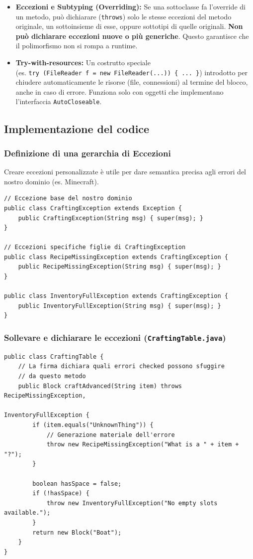 \documentclass[12pt, a4paper]{article}
\begin{document}
\begin{itemize}
    \item \textbf{Eccezioni e Subtyping (Overriding):} Se una sottoclasse fa l'override di un metodo, può dichiarare (\texttt{throws}) solo le stesse eccezioni del metodo originale, un sottoinsieme di esse, oppure sottotipi di quelle originali. \textbf{Non può dichiarare eccezioni nuove o più generiche}. Questo garantisce che il polimorfismo non si rompa a runtime.

    \item \textbf{Try-with-resources:} Un costrutto speciale \\ (es. \texttt{try (FileReader f = new FileReader(...)) \{ ... \}}) introdotto per chiudere automaticamente le risorse (file, connessioni) al termine del blocco, anche in caso di errore. Funziona solo con oggetti che implementano l'interfaccia \texttt{AutoCloseable}.
\end{itemize}

\subsection{Implementazione del codice}

\subsubsection{Definizione di una gerarchia di Eccezioni}
Creare eccezioni personalizzate è utile per dare semantica precisa agli errori del nostro dominio (es. Minecraft).
\begin{verbatim}
// Eccezione base del nostro dominio
public class CraftingException extends Exception {
    public CraftingException(String msg) { super(msg); }
}

// Eccezioni specifiche figlie di CraftingException
public class RecipeMissingException extends CraftingException {
    public RecipeMissingException(String msg) { super(msg); }
}

public class InventoryFullException extends CraftingException {
    public InventoryFullException(String msg) { super(msg); }
}
\end{verbatim}

\newpage

\subsubsection{Sollevare e dichiarare le eccezioni (\texttt{CraftingTable.java})}
\begin{verbatim}
public class CraftingTable {
    // La firma dichiara quali errori checked possono sfuggire 
    // da questo metodo
    public Block craftAdvanced(String item) throws RecipeMissingException, 
                                                   InventoryFullException {
        if (item.equals("UnknownThing")) {
            // Generazione materiale dell'errore
            throw new RecipeMissingException("What is a " + item + "?");
        }
        
        boolean hasSpace = false;
        if (!hasSpace) {
            throw new InventoryFullException("No empty slots available.");
        }
        return new Block("Boat");
    }
}
\end{verbatim}
\end{document}
